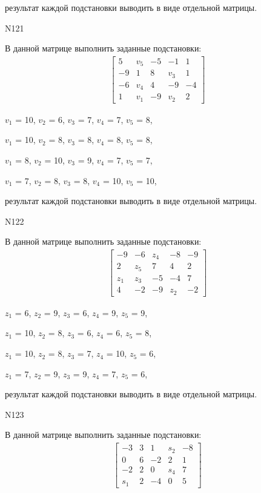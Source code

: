 \documentclass[11pt]{report}
\begin{document}
результат каждой подстановки выводить в виде отдельной матрицы.

N121

В данной матрице выполнить заданные подстановки:
\begin{align*}
\left[\begin{matrix}5 & v_{5} & -5 & -1 & 1\\-9 & 1 & 8 & v_{3} & 1\\-6 & v_{4} & 4 & -9 & -4\\1 & v_{1} & -9 & v_{2} & 2\end{matrix}\right]
\end{align*}


$v_{1}$ = 10, $v_{2}$ = 6, $v_{3}$ = 7, $v_{4}$ = 7, $v_{5}$ = 8, 

$v_{1}$ = 10, $v_{2}$ = 8, $v_{3}$ = 8, $v_{4}$ = 8, $v_{5}$ = 8, 

$v_{1}$ = 8, $v_{2}$ = 10, $v_{3}$ = 9, $v_{4}$ = 7, $v_{5}$ = 7, 

$v_{1}$ = 7, $v_{2}$ = 8, $v_{3}$ = 8, $v_{4}$ = 10, $v_{5}$ = 10, 

результат каждой подстановки выводить в виде отдельной матрицы.

N122

В данной матрице выполнить заданные подстановки:
\begin{align*}
\left[\begin{matrix}-9 & -6 & z_{4} & -8 & -9\\2 & z_{5} & 7 & 4 & 2\\z_{1} & z_{3} & -5 & -4 & 7\\4 & -2 & -9 & z_{2} & -2\end{matrix}\right]
\end{align*}


$z_{1}$ = 6, $z_{2}$ = 9, $z_{3}$ = 6, $z_{4}$ = 9, $z_{5}$ = 9, 

$z_{1}$ = 10, $z_{2}$ = 8, $z_{3}$ = 6, $z_{4}$ = 6, $z_{5}$ = 8, 

$z_{1}$ = 10, $z_{2}$ = 8, $z_{3}$ = 7, $z_{4}$ = 10, $z_{5}$ = 6, 

$z_{1}$ = 7, $z_{2}$ = 9, $z_{3}$ = 9, $z_{4}$ = 7, $z_{5}$ = 6, 

результат каждой подстановки выводить в виде отдельной матрицы.

N123

В данной матрице выполнить заданные подстановки:
\begin{align*}
\left[\begin{matrix}-3 & 3 & 1 & s_{2} & -8\\0 & 6 & -2 & 2 & 1\\-2 & 2 & 0 & s_{4} & 7\\s_{1} & 2 & -4 & 0 & 5\end{matrix}\right]
\end{align*}
\end{document}
